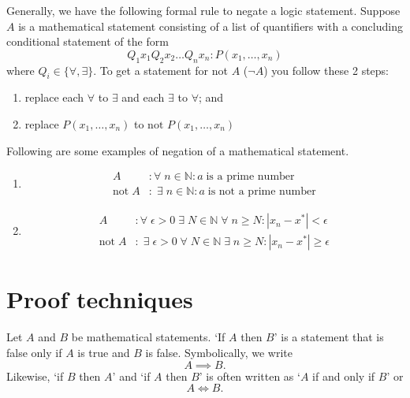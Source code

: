 \begin{theorem}
    Generally, we have the following formal rule to negate a logic statement. Suppose $A$ is a mathematical statement consisting of a list of quantifiers with a concluding conditional statement of the form \[Q_1x_1Q_2x_2\ldots Q_nx_n:P(x_1,\ldots,x_n)\] where $Q_i\in\{\forall,\exists\}$. To get a statement for not $A$ ($\lnot A$) you follow these 2 steps:
    \begin{enumerate}
        \item replace each $\forall$ to $\exists$ and each $\exists$ to $\forall$; and
        \item replace $P(x_1,\ldots,x_n)$ to $\text{not }P(x_1,\ldots,x_n)$
    \end{enumerate}
\end{theorem}

\begin{example}
    Following are some examples of negation of a mathematical statement.
    \begin{enumerate}
        \item
        \begin{align*}
            A&:\forall\;n\in\mathbb N:a\;\text{is a prime number}\\
            \text{not}\;A&:\;\exists\;n\in\mathbb N:a\;\text{is not a prime number}
        \end{align*}
        
        \item
        \begin{align*}
            A&:\forall\;\epsilon>0\;\exists\;N\in\mathbb N\;\forall\;n\geq N:|x_n-x^*|<\epsilon\\
            \text{not}\;A&:\;\exists\;\epsilon>0\;\forall\;N\in\mathbb N\;\exists\;n\geq N:|x_n-x^*|\geq\epsilon
        \end{align*}
    \end{enumerate}
\end{example}

\section{Proof techniques}

\begin{definition}
    Let $A$ and $B$ be mathematical statements. `If $A$ then $B$' is a statement that is false only if $A$ is true and $B$ is false. Symbolically, we write \[A\implies B.\] Likewise, `if $B$ then $A$' and `if $A$ then $B$' is often written as `$A$ if and only if $B$' or \[A\iff B.\]
\end{definition}

